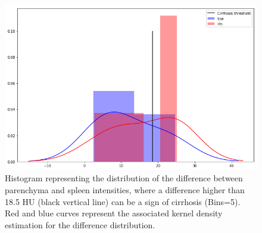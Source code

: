 \begin{figure}[!ht]
	\centering
	\includegraphics[width=0.6\linewidth]{../Contributions/images/LITS_TCIA_cirrhosisPlot}
	\caption{Histogram representing the distribution of the difference between parenchyma and spleen intensities, where a difference higher than 18.5 HU (black vertical line) can be a sign of cirrhosis (Bins=5). Red and blue curves represent the associated kernel density estimation for the difference distribution.}
	\label{fig:cirrhosisPlot}
\end{figure}


